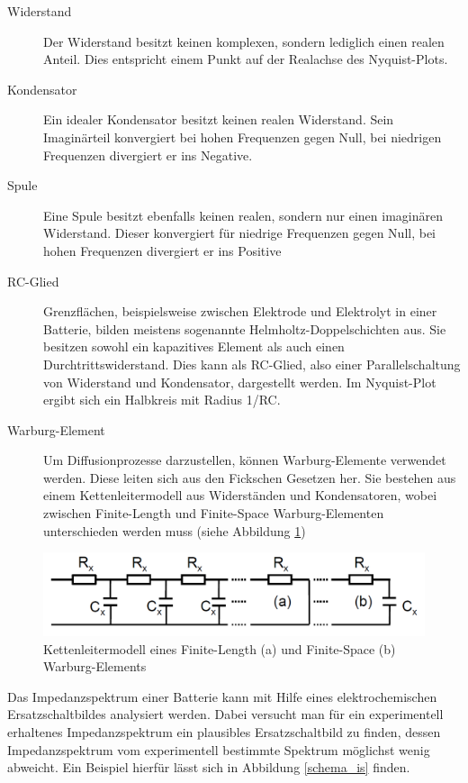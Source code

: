 \documentclass[a4paper, 11pt, headsepline,footsepline,twoside,abstract]{scrbook}
\begin{document}
\begin{description}
\item[Widerstand] Der Widerstand besitzt keinen komplexen, sondern lediglich einen realen Anteil. Dies entspricht einem Punkt auf der Realachse des Nyquist-Plots.
\item[Kondensator] Ein idealer Kondensator besitzt keinen realen Widerstand. Sein Imaginärteil konvergiert bei hohen Frequenzen gegen Null, bei niedrigen Frequenzen divergiert er ins Negative.
\item[Spule] Eine Spule besitzt ebenfalls keinen realen, sondern nur einen imaginären Widerstand. Dieser konvergiert für niedrige Frequenzen gegen Null, bei hohen Frequenzen divergiert er ins Positive
\item[RC-Glied] Grenzflächen, beispielsweise zwischen Elektrode und Elektrolyt in einer Batterie, bilden meistens sogenannte Helmholtz-Doppelschichten aus. Sie besitzen sowohl ein kapazitives Element als auch einen Durchtrittswiderstand. Dies kann als RC-Glied, also einer Parallelschaltung von Widerstand und Kondensator, dargestellt werden. Im Nyquist-Plot ergibt sich ein Halbkreis mit Radius 1/RC.
\item[Warburg-Element] Um Diffusionprozesse darzustellen, können Warburg-Elemente verwendet werden. Diese leiten sich aus den Fickschen Gesetzen her. Sie bestehen aus einem Kettenleitermodell aus Widerständen und Kondensatoren, wobei zwischen Finite-Length und Finite-Space Warburg-Elementen unterschieden werden muss (siehe Abbildung \ref{warburg_element})
\end{description}
\begin{figure}
	\centering
	\includegraphics[width=0.9\columnwidth]{images/warburg_element.png}
	\caption{Kettenleitermodell eines Finite-Length (a) und Finite-Space (b) Warburg-Elements \cite{bub_skript}}
	\label{warburg_element}
\end{figure}
Das Impedanzspektrum einer Batterie kann mit Hilfe eines elektrochemischen Ersatzschaltbildes analysiert werden. Dabei versucht man für ein experimentell erhaltenes Impedanzspektrum ein plausibles Ersatzschaltbild zu finden, dessen Impedanzspektrum vom experimentell bestimmte Spektrum möglichst wenig abweicht. Ein Beispiel hierfür lässt sich in Abbildung \ref{schema_is} finden.
\end{document}
